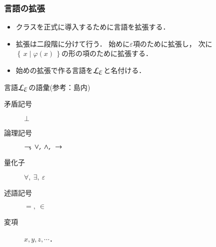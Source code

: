 \documentclass[dvipdfmx,10pt,notheorems]{beamer}
\theoremstyle{definition}
\newcommand{\lang}[1]{\mathcal{L}_{\scalebox{1.2}{$#1$}}} %
\newcommand{\Set}[2]{\left\{\, #1 \mid #2\, \right\}} %
\newcommand{\negation}{\rightharpoondown\hspace{-0.25em}} %
\newcommand{\rarrow}{\hspace{0.25em}\rightarrow\hspace{0.25em}} %
\begin{document}
\begin{frame}\frametitle{言語の拡張}
	\begin{itemize}
		\item クラスを正式に導入するために言語を拡張する．
		\item 拡張は二段階に分けて行う．
			始めに$\varepsilon$項のために拡張し，
			次に$\Set{x}{\varphi(x)}$の形の項のために拡張する．
			
		\item 始めの拡張で作る言語を$\lang{\varepsilon}$と名付ける．
	\end{itemize}

	\begin{exampleblock}{言語$\lang{\varepsilon}$の語彙(参考：島内\cite{Shimauchi})}
		\begin{description}
			\item[矛盾記号] $\bot$
			\item[論理記号] $\negation,\ \vee,\ \wedge,\ \rarrow$
			\item[量化子] $\forall,\ \exists,\ \varepsilon$
			\item[述語記号] $=,\ \in$
			\item[変項] $x,y,z,\cdots$．
		\end{description}
	\end{exampleblock}
\end{frame}
\end{document}
